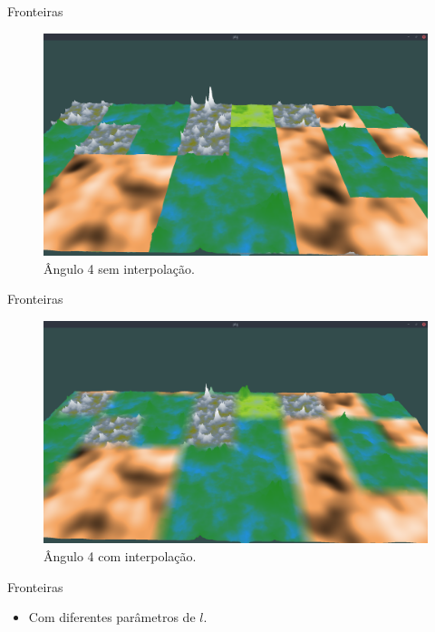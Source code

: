 \begin{frame}{Fronteiras}
    \begin{figure}[H]
        \centering
        \includegraphics[width=.9\textwidth]{img/border/a9/4s.png}
        \caption{Ângulo 4 sem interpolação.}
        \label{fig:img_border_a9_4s}
    \end{figure}
    
\end{frame}


\begin{frame}{Fronteiras}
    \begin{figure}[H]
        \centering
        \includegraphics[width=.9\textwidth]{img/border/a9/4c.png}
        \caption{Ângulo 4 com interpolação.}
        \label{fig:img_border_a9_4c}
    \end{figure}
    
\end{frame}

\begin{frame}{Fronteiras}
    \begin{itemize} \setlength\itemsep{1em}
        \item Com diferentes parâmetros de $l$.
    \end{itemize}
    
    
\end{frame}

